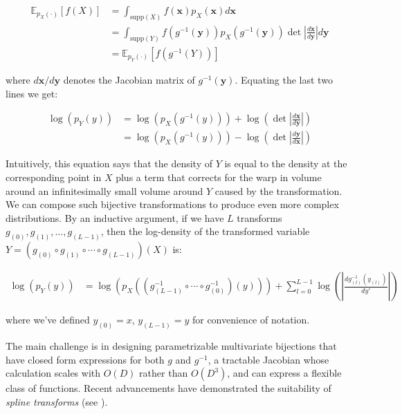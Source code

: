 \documentclass{scrartcl} %
\begin{document}
	\begin{equation*}
    \begin{aligned}
	\mathbb{E}_{p_X(\cdot)}\left[f(X)\right] &= \int_{\text{supp}(X)}f(\mathbf{x})p_X(\mathbf{x})d\mathbf{x}\\
	&= \int_{\text{supp}(Y)}f(g^{-1}(\mathbf{y}))p_X(g^{-1}(\mathbf{y}))\det\left|\frac{d\mathbf{x}}{d\mathbf{y}}\right|d\mathbf{y}\\
	&= \mathbb{E}_{p_Y(\cdot)}\left[f(g^{-1}(Y))\right]
	\end{aligned}
	\end{equation*}

where $d\mathbf{x}/d\mathbf{y}$ denotes the Jacobian matrix of $g^{-1}(\mathbf{y})$. Equating the last two lines we get:

\begin{equation*}
	\begin{aligned}
	\log(p_Y(y)) &= \log(p_X(g^{-1}(y)))+\log\left(\det\left|\frac{d\mathbf{x}}{d\mathbf{y}}\right|\right)\\
	&= \log(p_X(g^{-1}(y)))-\log\left(\det\left|\frac{d\mathbf{y}}{d\mathbf{x}}\right|\right)
	\end{aligned}
\end{equation*}

Intuitively, this equation says that the density of $Y$ is equal to the density at the corresponding point in $X$ plus a term that corrects for the warp in volume around an infinitesimally small volume around $Y$ caused by the transformation.
We can compose such bijective transformations to produce even more complex distributions. By an inductive argument, if we have $L$ transforms $g_{(0)}, g_{(1)},\ldots,g_{(L-1)}$, then the log-density of the transformed variable $Y=(g_{(0)}\circ g_{(1)}\circ\cdots\circ g_{(L-1)})(X)$ is:

\begin{equation*}
	\begin{aligned}
		\log(p_Y(y)) &= \log\left(p_X\left(\left(g_{(L-1)}^{-1}\circ\cdots\circ g_{(0)}^{-1}\right)\left(y\right)\right)\right)+\sum^{L-1}_{l=0}\log\left(\left|\frac{dg^{-1}_{(l)}(y_{(l)})}{dy'}\right|\right)
	\end{aligned}
\end{equation*}

where we've defined $y_{(0)}=x$, $y_{(L-1)}=y$ for convenience of notation.

The main challenge is in designing parametrizable multivariate bijections that have closed form expressions for both $g$ and $g^{-1}$, a tractable Jacobian whose calculation scales with $O(D)$ rather than $O(D^3)$, and can express a flexible class of functions. Recent advancements have demonstrated the suitability of \emph{spline transforms} (see \cite{durkan}).
\end{document}
